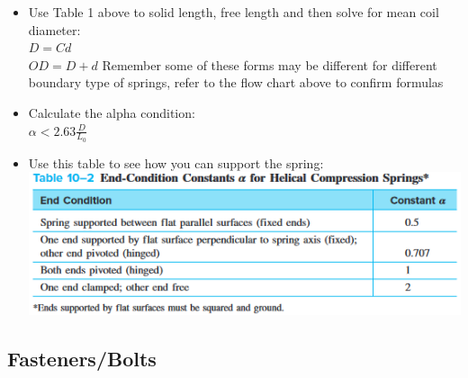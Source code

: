 \documentclass[11pt, fleqn]{article}
\begin{document}
\begin{itemize}
    \item Use Table 1 above to solid length, free length and then solve for mean coil diameter:\\
    $D = Cd$\\
    $OD = D + d$ Remember some of these forms may be different for different boundary type of springs, refer to the flow chart above to confirm formulas\\

    \item Calculate the alpha condition:\\
    $\alpha < 2.63\frac{D}{L_0}$\\

    \item Use this table to see how you can support the spring:\\
    \includegraphics[scale=0.8]{Springs/Tab10-2.png}\\
\end{itemize}

\subsection{Fasteners/Bolts}
\end{document}
